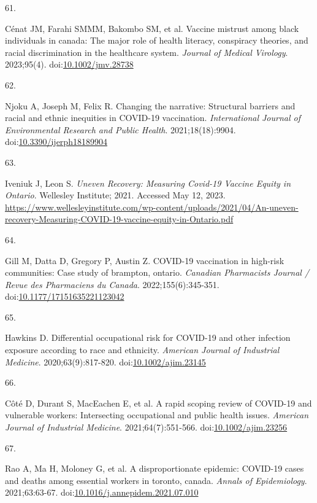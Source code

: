 \documentclass[
]{article}
\newlength{\cslhangindent}
\newlength{\csllabelwidth}
\newlength{\cslentryspacingunit} %
\newenvironment{CSLReferences}[2] %
 {%
  \setlength{\parindent}{0pt}
  \ifodd #1
  \let\oldpar\par
  \def\par{\hangindent=\cslhangindent\oldpar}
  \fi
  \setlength{\parskip}{#2\cslentryspacingunit}
 }%
 {}
\newcommand{\CSLLeftMargin}[1]{\parbox[t]{\csllabelwidth}{#1}}
\newcommand{\CSLRightInline}[1]{\parbox[t]{\linewidth - \csllabelwidth}{#1}\break}
\begin{document}
\begin{CSLReferences}{0}{0}
\leavevmode{}%
\CSLLeftMargin{61. }%
\CSLRightInline{Cénat JM, Farahi SMMM, Bakombo SM, et al. Vaccine
mistrust among black individuals in canada: The major role of health
literacy, conspiracy theories, and racial discrimination in the
healthcare system. \emph{Journal of Medical Virology}. 2023;95(4).
doi:\href{https://doi.org/10.1002/jmv.28738}{10.1002/jmv.28738}}

\leavevmode{}%
\CSLLeftMargin{62. }%
\CSLRightInline{Njoku A, Joseph M, Felix R. Changing the narrative:
Structural barriers and racial and ethnic inequities in {COVID}-19
vaccination. \emph{International Journal of Environmental Research and
Public Health}. 2021;18(18):9904.
doi:\href{https://doi.org/10.3390/ijerph18189904}{10.3390/ijerph18189904}}

\leavevmode{}%
\CSLLeftMargin{63. }%
\CSLRightInline{Iveniuk J, Leon S. \emph{Uneven Recovery: Measuring
Covid-19 Vaccine Equity in Ontario}. Wellesley Institute; 2021. Accessed
May 12, 2023.
\url{https://www.wellesleyinstitute.com/wp-content/uploads/2021/04/An-uneven-recovery-Measuring-COVID-19-vaccine-equity-in-Ontario.pdf}}

\leavevmode{}%
\CSLLeftMargin{64. }%
\CSLRightInline{Gill M, Datta D, Gregory P, Austin Z. {COVID}-19
vaccination in high-risk communities: Case study of brampton, ontario.
\emph{Canadian Pharmacists Journal / Revue des Pharmaciens du Canada}.
2022;155(6):345-351.
doi:\href{https://doi.org/10.1177/17151635221123042}{10.1177/17151635221123042}}

\leavevmode{}%
\CSLLeftMargin{65. }%
\CSLRightInline{Hawkins D. Differential occupational risk for {COVID}-19
and other infection exposure according to race and ethnicity.
\emph{American Journal of Industrial Medicine}. 2020;63(9):817-820.
doi:\href{https://doi.org/10.1002/ajim.23145}{10.1002/ajim.23145}}

\leavevmode{}%
\CSLLeftMargin{66. }%
\CSLRightInline{Côté D, Durant S, MacEachen E, et al. A rapid scoping
review of {COVID}-19 and vulnerable workers: Intersecting occupational
and public health issues. \emph{American Journal of Industrial
Medicine}. 2021;64(7):551-566.
doi:\href{https://doi.org/10.1002/ajim.23256}{10.1002/ajim.23256}}

\leavevmode{}%
\CSLLeftMargin{67. }%
\CSLRightInline{Rao A, Ma H, Moloney G, et al. A disproportionate
epidemic: {COVID}-19 cases and deaths among essential workers in
toronto, canada. \emph{Annals of Epidemiology}. 2021;63:63-67.
doi:\href{https://doi.org/10.1016/j.annepidem.2021.07.010}{10.1016/j.annepidem.2021.07.010}}


\end{CSLReferences}
\end{document}
